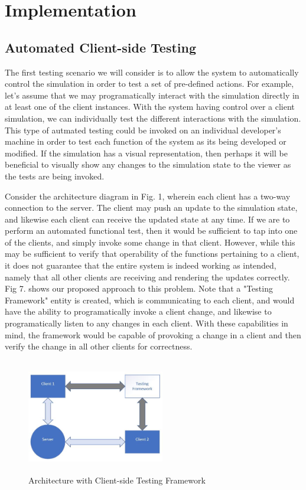 \documentclass[conference]{IEEEtran}
\begin{document}
\section{Implementation}


\subsection{Automated Client-side Testing}

The first testing scenario we will consider is to allow the system to automatically control the simulation in order to test a set of pre-defined actions.
For example, let's assume that we may programatically interact with the simulation directly in at least one of the client instances. With the system having control over a client simulation, 
we can individually test the different interactions with the simulation. This type of autmated testing could be invoked on an individual developer's 
machine in order to test each function of the system as its being developed or modified. If the simulation has a visual representation, then perhaps it will be beneficial to 
visually show any changes to the simulation state to the viewer as the tests are being invoked.  

Consider the architecture diagram in Fig. 1, wherein each client has a two-way connection to the server. The client may push an update to the simulation state, and likewise each
client can receive the updated state at any time. If we are to perform an automated functional test, then it would be sufficient to tap into one of the clients, and simply invoke 
some change in that client. However, while this may be sufficient to verify that operability of the functions pertaining to a client, it does not guarantee that the entire system 
is indeed working as intended, namely that all other clients are receiving and rendering the updates correctly. Fig 7. shows our proposed approach to this problem. Note that a "Testing Framework"
entity is created, which is communicating to each client, and would have the ability to programatically invoke a client change, and likewise to programatically listen to any changes in each client.
With these capabilities in mind, the framework would be capable of provoking a change in a client and then verify the change in all other clients for correctness. 


\begin{figure}[htbp]
\centerline{\includegraphics [width = 6cm, height = 5cm] {images/ClientSideFrameworkDiagram.jpg}}
\caption{Architecture with Client-side Testing Framework}
\end{figure}
\end{document}
